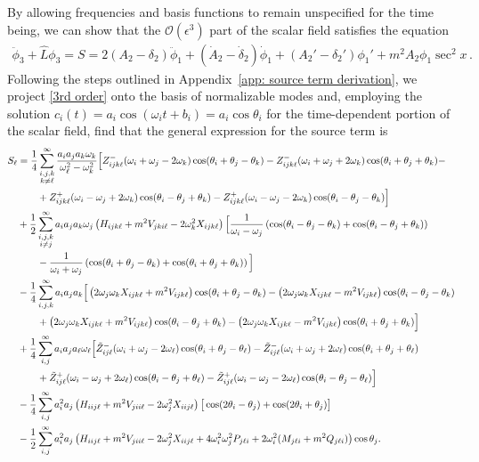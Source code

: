 \documentclass[letterpaper,11pt]{article}
\newcommand{\oi}{\omega_i}
\newcommand{\oj}{\omega_j}
\newcommand{\ok}{\omega_k}
\newcommand{\ol}{\omega_\ell}
\newcommand{\thi}{\theta_i}
\newcommand{\thj}{\theta_j}
\newcommand{\thk}{\theta_k}
\newcommand{\thl}{\theta_\ell}
\newcommand{\mc}{\mathcal}
\begin{document}
By allowing frequencies and basis functions to remain unspecified for the time being, we can show that the $\mc O(\epsilon^3)$ part of the scalar field satisfies the equation
\begin{align}
\label{3rd order}
\ddot \phi_3 + \hat L \phi_3 = S = 2 (A_2 - \delta_2) \ddot \phi_1 + (\dot A_2 - \dot \delta_2) \dot\phi_1 + (A_2' -\delta_2' )\phi_1' + m^2 A_2 \phi_1 \sec^2 x \, .
\end{align}
Following the steps outlined in Appendix~\ref{app: source term derivation}, we project \eqref{3rd order} onto the basis of normalizable modes and, employing the solution ${c_i(t) = a_i \cos (\oi t + b_i) = a_i \cos\theta_i}$ for the time-dependent portion of the scalar field, find that the general expression for the source term is
\begin{align}
\label{general source}
S_\ell &=\frac{1}{4} \sum_{\substack{i,j,k \\ k \neq \ell}}^\infty \frac{a_i a_j a_k \ok}{\ol^2 - \ok^2} \Big[ Z^-_{ijk\ell} (\oi + \oj - 2\ok) \cos (\thi + \thj - \thk) - Z^-_{ijk\ell} (\oi + \oj + 2\ok) \cos (\thi + \thj + \thk) - \nonumber \\
%
&\qquad + Z^+_{ijk\ell} (\oi - \oj + 2\ok)  \cos(\thi - \thj + \thk) - Z^+_{ijk\ell} (\oi - \oj - 2\ok) \cos (\thi - \thj - \thk) \Big] \nonumber \\
%
& + \frac{1}{2}\sum_{\substack{i,j,k \\ i \neq j}}^\infty a_i a_j a_k \oj \left( H_{ijk\ell} + m^2 V_{jki\ell} - 2\ok^2 X_{ijk\ell} \right) \Big[ \frac{1}{\oi - \oj} \left( \cos (\thi - \thj - \thk)  + \cos(\thi - \thj + \thk) \right) \nonumber \\
%
& \qquad - \frac{1}{\oi + \oj} \left( \cos (\thi + \thj - \thk)  + \cos ( \thi + \thj + \thk) \right) \Big] \nonumber \\
%
& - \frac{1}{4} \sum_{i,j,k}^\infty a_i a_j a_k \Big[ \left( 2\oj \ok X_{ijk\ell} + m^2 V_{ijk\ell} \right)\cos(\thi + \thj - \thk) -  \left( 2\oj\ok X_{ijk\ell} - m^2 V_{ijk\ell} \right) \cos(\thi - \thj - \thk) \nonumber \\
%
& \qquad + \left(2\oj \ok X_{ijk\ell} + m^2 V_{ijk\ell} \right) \cos (\thi - \thj + \thk) - \left( 2\oj\ok X_{ijk\ell} - m^2 V_{ijk\ell} \right) \cos(\thi + \thj + \thk) \Big] \nonumber \\
%
& + \frac{1}{4} \sum_{i,j}^\infty a_i a_j a_\ell \ol \Big[ \tilde Z^-_{ij\ell} (\oi + \oj - 2\ol) \cos (\thi + \thj - \thl) - \tilde Z^-_{ij\ell} (\oi + \oj + 2\ol) \cos(\thi + \thj +  \thl) \nonumber \\
%
& \qquad + \tilde Z^+_{ij\ell} (\oi - \oj + 2\ol) \cos(\thi - \thj + \thl)  - \tilde Z^+_{ij\ell} (\oi - \oj - 2\ol) \cos( \thi - \thj - \thl)  \Big] \nonumber \\
%
& - \frac{1}{4} \sum_{i,j}^\infty a_i^2 a_j \left( H_{iij\ell} + m^2 V_{jii\ell} - 2\oj^2 X_{iij\ell} \right) \big[ \cos (2\thi - \thj) + \cos (2\thi + \thj) \big] \nonumber \\
%
& - \frac{1}{2} \sum_{i,j}^\infty a_i^2 a_j \left( H_{iij\ell} + m^2 V_{jii\ell} - 2\oj^2 X_{iij\ell} + 4\oi^2 \oj^2 P_{j\ell i} + 2\oi^2 (M_{j\ell i} + m^2 Q_{j\ell i}) \right) \cos \thj . \hspace{-0.2in}
\end{align} 
\end{document}
